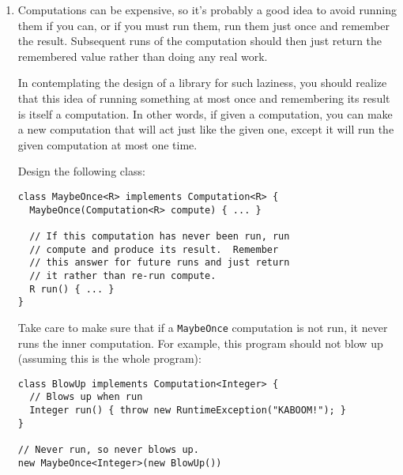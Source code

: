 \documentclass[12pt]{article}                   %
\begin{document}
\begin{problem}
\begin{enumerate}
\item

Computations can be expensive, so it's probably a good idea to avoid
 running them if you can, or if you must run them, run them just once
 and remember the result. Subsequent runs of the computation should
 then just return the remembered value rather than doing any real
 work.

In contemplating the design of a library for such laziness, you should
 realize that this idea of running something at most once and
 remembering its result is itself a computation.  In other words, if
 given a computation, you can make a new computation that will act
 just like the given one, except it will run the given computation at
 most one time.

Design the following class:

\begin{verbatim}
class MaybeOnce<R> implements Computation<R> {
  MaybeOnce(Computation<R> compute) { ... }

  // If this computation has never been run, run
  // compute and produce its result.  Remember
  // this answer for future runs and just return
  // it rather than re-run compute.
  R run() { ... }
}
\end{verbatim}

Take care to make sure that if a \texttt{MaybeOnce} computation is not
run, it never runs the inner computation.  For example, 
this program should not blow up (assuming this is the whole program):

\begin{verbatim}
class BlowUp implements Computation<Integer> {
  // Blows up when run
  Integer run() { throw new RuntimeException("KABOOM!"); }
}

// Never run, so never blows up.
new MaybeOnce<Integer>(new BlowUp())
\end{verbatim}
\end{enumerate}


\end{problem}
\end{document}
